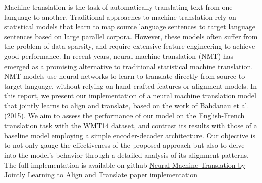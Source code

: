 
\textbf{}
Machine translation is the task of automatically translating text from one language to another. Traditional approaches to machine translation rely on statistical models that learn to map source language sentences to target language sentences based on large parallel corpora. However, these models often suffer from the problem of data sparsity, and require extensive feature engineering to achieve good performance. In recent years, neural machine translation (NMT) has emerged as a promising alternative to traditional statistical machine translation. NMT models use neural networks to learn to translate directly from source to target language, without relying on hand-crafted features or alignment models. In this report, we present our implementation of a neural machine translation model that jointly learns to align and translate, based on the work of Bahdanau et al. (2015). We aim to assess the performance of our model on the English-French translation task with the WMT14 dataset, and contrast its results with those of a baseline model employing a simple encoder-decoder architecture. Our objective is to not only gauge the effectiveness of the proposed approach but also to delve into the model's behavior through a detailed analysis of its alignment patterns. The full implementation is available on github \href{https://github.com/alhussein-jamil/MLA_Project}{Neural Machine Translation by Jointly Learning to Align and Translate paper implementation} 